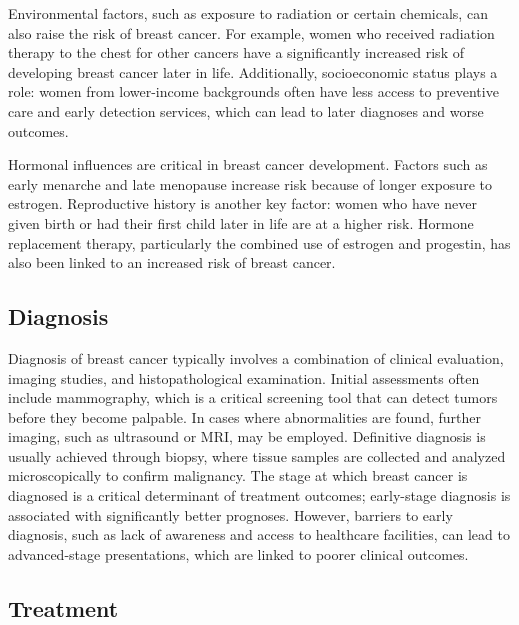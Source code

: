 Environmental factors, such as exposure to radiation or certain chemicals, can
also raise the risk of breast cancer. For example, women who received radiation
therapy to the chest for other cancers have a significantly increased risk of
developing breast cancer later in life\supercite{froes_brandao_prolactin_2016}.
Additionally, socioeconomic status plays a role: women from lower-income
backgrounds often have less access to preventive care and early detection
services, which can lead to later diagnoses and worse
outcomes\supercite{cunningham_mind_2013}.

Hormonal influences are critical in breast cancer development. Factors such as
early menarche and late menopause increase risk because of longer exposure to
estrogen\supercite{nounu_sex_2022}. Reproductive history is another key factor:
women who have never given birth or had their first child later in life are at a
higher risk\supercite{claudia_admoun_etiology_2022}. Hormone replacement
therapy, particularly the combined use of estrogen and progestin, has also been
linked to an increased risk of breast cancer\supercite{turner_meta-analysis_2011}.

\subsection{Diagnosis}

Diagnosis of breast cancer typically involves a combination of clinical
evaluation, imaging studies, and histopathological examination. Initial
assessments often include mammography, which is a critical screening tool that
can detect tumors before they become palpable\supercite{hameed_breast_2020}. In
cases where abnormalities are found, further imaging, such as ultrasound or MRI,
may be employed. Definitive diagnosis is usually achieved through biopsy, where
tissue samples are collected and analyzed microscopically to confirm
malignancy\supercite{hameed_breast_2020}. The stage at which breast cancer is
diagnosed is a critical determinant of treatment outcomes; early-stage diagnosis
is associated with significantly better
prognoses\supercite{getachew_perceived_2020}. However, barriers to early
diagnosis, such as lack of awareness and access to healthcare facilities, can
lead to advanced-stage presentations, which are linked to poorer clinical
outcomes\supercite{getachew_perceived_2020,dickens_stage_2014}.

\subsection{Treatment}

